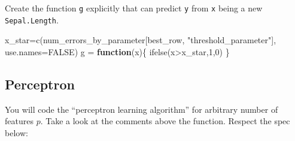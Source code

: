 \documentclass[
]{article}
\newenvironment{Shaded}{\begin{snugshade}}{\end{snugshade}}
\newcommand{\AttributeTok}[1]{\textcolor[rgb]{0.77,0.63,0.00}{#1}}
\newcommand{\ConstantTok}[1]{\textcolor[rgb]{0.00,0.00,0.00}{#1}}
\newcommand{\ControlFlowTok}[1]{\textcolor[rgb]{0.13,0.29,0.53}{\textbf{#1}}}
\newcommand{\DecValTok}[1]{\textcolor[rgb]{0.00,0.00,0.81}{#1}}
\newcommand{\FunctionTok}[1]{\textcolor[rgb]{0.00,0.00,0.00}{#1}}
\newcommand{\NormalTok}[1]{#1}
\newcommand{\OtherTok}[1]{\textcolor[rgb]{0.56,0.35,0.01}{#1}}
\newcommand{\SpecialCharTok}[1]{\textcolor[rgb]{0.00,0.00,0.00}{#1}}
\newcommand{\StringTok}[1]{\textcolor[rgb]{0.31,0.60,0.02}{#1}}
\begin{document}
Create the function \texttt{g} explicitly that can predict \texttt{y}
from \texttt{x} being a new \texttt{Sepal.Length}.

\begin{Shaded}
\begin{Highlighting}[]
\NormalTok{x\_star}\OtherTok{=}\FunctionTok{c}\NormalTok{(num\_errors\_by\_parameter[best\_row, }\StringTok{"threshold\_parameter"}\NormalTok{], }\AttributeTok{use.names=}\ConstantTok{FALSE}\NormalTok{)}
\NormalTok{g }\OtherTok{=} \ControlFlowTok{function}\NormalTok{(x)\{}
  \FunctionTok{ifelse}\NormalTok{(x}\SpecialCharTok{\textgreater{}}\NormalTok{x\_star,}\DecValTok{1}\NormalTok{,}\DecValTok{0}\NormalTok{)}
\NormalTok{\}}
\end{Highlighting}
\end{Shaded}

\hypertarget{perceptron}{%
\subsection{Perceptron}\label{perceptron}}

You will code the ``perceptron learning algorithm'' for arbitrary number
of features \(p\). Take a look at the comments above the function.
Respect the spec below:
\end{document}
